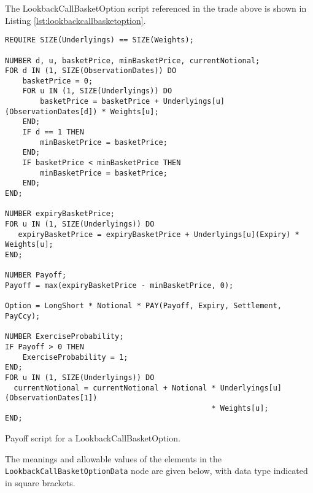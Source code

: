 The LookbackCallBasketOption script referenced in the trade above is
shown in Listing \ref{lst:lookbackcallbasketoption}.

\begin{listing}[hbt]
\begin{verbatim}
REQUIRE SIZE(Underlyings) == SIZE(Weights);

NUMBER d, u, basketPrice, minBasketPrice, currentNotional;
FOR d IN (1, SIZE(ObservationDates)) DO
    basketPrice = 0;
    FOR u IN (1, SIZE(Underlyings)) DO
        basketPrice = basketPrice + Underlyings[u](ObservationDates[d]) * Weights[u];
    END;
    IF d == 1 THEN
        minBasketPrice = basketPrice;
    END;
    IF basketPrice < minBasketPrice THEN
        minBasketPrice = basketPrice;
    END;
END;

NUMBER expiryBasketPrice;
FOR u IN (1, SIZE(Underlyings)) DO
   expiryBasketPrice = expiryBasketPrice + Underlyings[u](Expiry) * Weights[u];
END;

NUMBER Payoff;
Payoff = max(expiryBasketPrice - minBasketPrice, 0);

Option = LongShort * Notional * PAY(Payoff, Expiry, Settlement, PayCcy);

NUMBER ExerciseProbability;
IF Payoff > 0 THEN
    ExerciseProbability = 1;
END;
FOR u IN (1, SIZE(Underlyings)) DO
  currentNotional = currentNotional + Notional * Underlyings[u](ObservationDates[1])
                                               * Weights[u];
END;
\end{verbatim}
\caption{Payoff script for a LookbackCallBasketOption.}
\label{lst:lookbackcallbasketoption}
\end{listing}

The meanings and allowable values of the elements in the
\lstinline!LookbackCallBasketOptionData! node are given below, with data
type indicated in square brackets.

